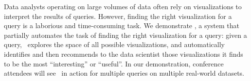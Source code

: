 

% 
Data analysts operating on large volumes of data 
often rely on visualizations to interpret the results of queries. 
However, finding the right visualization for a query is 
a laborious and time-consuming task. 
We demonstrate \SeeDB, a system that partially automates 
the task of finding the right visualization for a query: 
given a query, \SeeDB\ explores the space of all possible visualizations,
and automatically identifies and then recommends to the data scientist
those visualizations it finds to be the most ``interesting'' or ``useful''. 
In our demonstration, conference attendees
will see \SeeDB\ in action for multiple queries on multiple real-world datasets.




